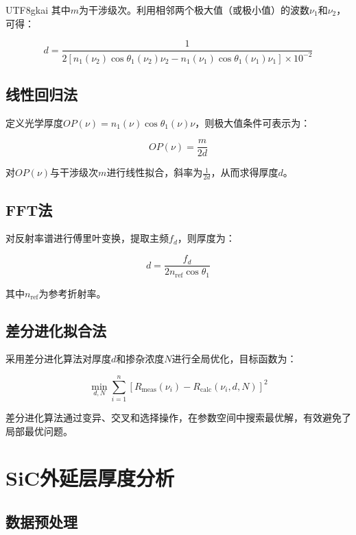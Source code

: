 \documentclass[12pt,a4paper]{article}
\begin{document}
\begin{CJK}{UTF8}{gkai}
其中$m$为干涉级次。利用相邻两个极大值（或极小值）的波数$\nu_1$和$\nu_2$，可得：

\begin{equation}
d = \frac{1}{2\left[n_1(\nu_2)\cos\theta_1(\nu_2)\nu_2 - n_1(\nu_1)\cos\theta_1(\nu_1)\nu_1\right] \times 10^{-2}}
\end{equation}

\subsection{线性回归法}

定义光学厚度$OP(\nu) = n_1(\nu)\cos\theta_1(\nu)\nu$，则极大值条件可表示为：

\begin{equation}
OP(\nu) = \frac{m}{2d}
\end{equation}

对$OP(\nu)$与干涉级次$m$进行线性拟合，斜率为$\frac{1}{2d}$，从而求得厚度$d$。

\subsection{FFT法}

对反射率谱进行傅里叶变换，提取主频$f_d$，则厚度为：

\begin{equation}
d = \frac{f_d}{2n_{\text{ref}}\cos\theta_1}
\end{equation}

其中$n_{\text{ref}}$为参考折射率。

\subsection{差分进化拟合法}

采用差分进化算法对厚度$d$和掺杂浓度$N$进行全局优化，目标函数为：

\begin{equation}
\min_{d,N} \sum_{i=1}^{n} \left[R_{\text{meas}}(\nu_i) - R_{\text{calc}}(\nu_i,d,N)\right]^2
\end{equation}

差分进化算法通过变异、交叉和选择操作，在参数空间中搜索最优解，有效避免了局部最优问题。

\section{SiC外延层厚度分析}

\subsection{数据预处理}


\end{CJK}
\end{document}
